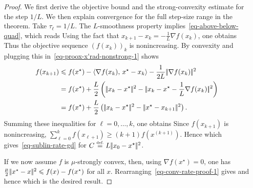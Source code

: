\begin{proof}
	We first derive the objective bound and the strong-convexity estimate for the step $1/L$. We then explain convergence for the full step-size range in the theorem.
	Take $\tau_\ell=1/L$.
	The $L$-smoothness property implies~\eqref{eq-above-below-quad}, which reads
	Using the fact that $x_{k+1}-x_k = -\frac{1}{L} \nabla f(x_k)$, one obtains
	Thus the objective sequence $(f(x_k))_k$ is nonincreasing.
	By convexity
	and plugging this in~\eqref{eq-proox-x'rad-nonstrong-1} shows
	\begin{align}
		f(x_{k+1})  &\leq   
		f(x^\star) - \dotp{\nabla f(x_k)}{x^\star-x_k} - \frac{1}{2L} \norm{\nabla f(x_k)}^2 \\
		&= f(x^\star) + \frac{L}{2}\pa{
			\norm{x_k-x^\star}^2 - \norm{x_k-x^\star-\frac{1}{L}\nabla f(x_k)}^2
		}\\
		&= f(x^\star) + \frac{L}{2}\pa{
			\norm{x_k-x^\star}^2 - \norm{x^\star-x_{k+1}}^2 }. \label{eq-conv-rate-proof-1}
	\end{align}
	Summing these inequalities for $\ell=0,\ldots,k$, one obtains
	Since $f(x_{k+1})$ is nonincreasing, $\sum_{\ell=0}^k f(x_{\ell+1}) \geq (k+1) f(x^{(k+1)})$. Hence
	which gives~\eqref{eq-sublin-rate-gd} for $C\stackrel{\mbox{\upshape\tiny def.}}{=} L|\!| x_0-x^\star |\!|^2$.
	
	If we now assume $f$ is $\mu$-strongly convex, then, using $\nabla f(x^\star)=0$, one has $\frac{\mu}{2}|\!| x^\star-x |\!|^2 \leqslant f(x)-f(x^\star)$ for all $x$. 
	Rearranging~\eqref{eq-conv-rate-proof-1} gives
	and hence
	which is the desired result.


\end{proof}
